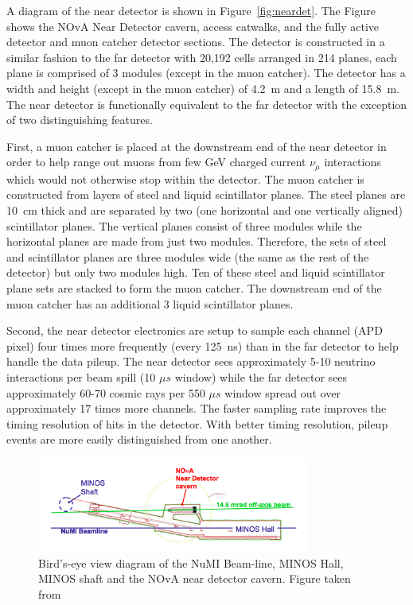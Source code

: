 A diagram of the near detector is shown in
Figure~\ref{fig:neardet}. The Figure shows the NOvA Near Detector
cavern, access catwalks, and the fully active detector and muon catcher
detector sections.
The detector is constructed in a similar fashion to the far detector
with 20,192 cells arranged in 214 planes, each plane is comprised of 3
modules (except in the muon catcher). The detector has a width and
height (except in the muon catcher) of 4.2~m and a length of
15.8~m. The near detector is
functionally equivalent to the far detector with the exception of two
distinguishing features.

First, a muon catcher is placed at the downstream end of the near
detector in order to help range out muons
from few GeV charged current $\nu_{\mu}$ interactions which would not
otherwise stop within the detector.
The muon catcher is constructed from layers of steel and liquid
scintillator planes. The steel planes are 10~cm
thick and are separated by 
two (one horizontal and one vertically aligned) scintillator planes.
The vertical planes consist of
three modules while the horizontal planes are made from just two
modules. Therefore, the sets of steel and scintillator planes are
three modules wide (the same as the rest of the detector) but only
two modules high. Ten of these steel and
liquid scintillator plane sets are stacked to form the muon
catcher. The downstream end of the muon catcher has an additional 3
liquid scintillator planes.

Second, the near detector electronics are setup to sample each channel
(APD pixel)
four times more frequently (every 125~ns) than in the far 
detector to help handle the data pileup. 
The near detector sees approximately 5-10 neutrino interactions per
beam spill (10 $\mu s$ window) while the far detector sees
approximately 60-70 cosmic rays per 550 $\mu s$ window spread out over
approximately 17 times more channels. The faster sampling rate
improves the timing resolution of hits in the detector. With better
timing resolution, pileup events are more easily distinguished from one
another. 




\begin{figure}
  \centering
  \includegraphics[width=0.8\textwidth]{../../img/baird/det/neardet_cavern_diagram.png}
  \caption{Bird's-eye view diagram of the NuMI Beam-line, MINOS Hall, MINOS
    shaft and the NOvA near detector cavern. Figure taken from~\cite{}}
  \label{fig:cavern}
\end{figure}

